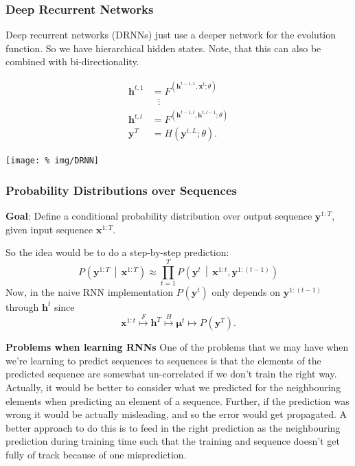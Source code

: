 \documentclass[a2paper,8pt]{extarticle}
\newcommand{\Prob}[2][]{P_{#1}\left( #2 \right)}
\newcommand{\cProb}[3][]{P_{#1}\left( #2 \,\middle|\, #3 \right)}
\renewcommand{\vec}[1]{\mathbf{#1}}
\newcommand{\vh}{\vec{h}}
\newcommand{\vx}{\vec{x}}
\newcommand{\vy}{\vec{y}}
\newcommand{\vmu}{\boldsymbol{\mu}}
\begin{document}
\begin{landscape}
\begin{multicols*}{7}
\subsubsection{Deep Recurrent Networks}

Deep recurrent networks (DRNNs) just use a deeper network for the evolution
function. So we have hierarchical hidden states. Note, that this can also be
combined with bi-directionality.

\begin{multicols}{2}
\begin{align*}
\vh^{t,1}&=F^(\vh^{t-1,1},\vx^t;\theta)\\
&\,\,\,\,\vdots\\
\vh^{t,l}&=F^(\vh^{t-1,l},\vh^{t,l-1};\theta)\\
\vy^T&=H(\vy^{t,L};\theta).
\end{align*}
\begin{center}
  \texttt{[image: \%
img/DRNN]}
\end{center}
\end{multicols}





\subsubsection{Probability Distributions over Sequences}

\textbf{Goal}: Define a conditional probability distribution over output
sequence $\vy^{1:T}$, given input sequence $\vx^{1:T}$.

So the idea would be to do a step-by-step prediction:
\[
\cProb{\vy^{1:T}}{\vx^{1:T}}
\approx
\prod_{t=1}^T
\cProb{\vy^t}{\vx^{1:t},\vy^{1:(t-1)}}
\]
Now, in the naive RNN implementation $\Prob{\vy^t}$ only depends on
$\vy^{1:(t-1)}$ through $\vh^t$ since
\[
\vx^{1:t}
\stackrel{F}{\mapsto}
\vh^T
\stackrel{H}{\mapsto}
\vmu^t
\mapsto
\Prob{\vy^T}.
\]

\textbf{Problems when learning RNNs} One of the problems that we may have when
we're learning to predict sequences to sequences is that the elements of the
predicted sequence are somewhat un-correlated if we don't train the right way.
Actually, it would be better to consider what we predicted for the neighbouring
elements when predicting an element of a sequence. Further, if the prediction
was wrong it would be actually misleading, and so the error would get
propagated. A better approach to do this is to feed in the right prediction as
the neighbouring prediction during training time such that the training and
sequence doesn't get fully of track because of one misprediction.


\end{multicols*}
\end{landscape}
\end{document}
